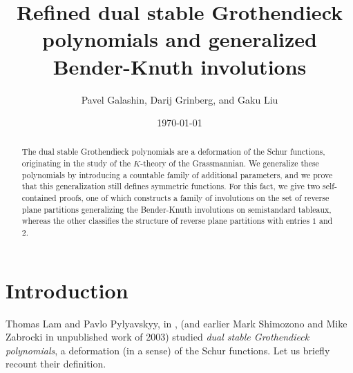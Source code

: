 \documentclass[numbers=enddot,12pt,final,onecolumn,notitlepage]{scrartcl}%
\theoremstyle{definition}
\begin{document}
\title{Refined dual stable Grothendieck polynomials and generalized Bender-Knuth involutions}
\author{Pavel Galashin, Darij Grinberg, and Gaku Liu}
\date{\today}
\maketitle

\begin{abstract}
The dual stable Grothendieck polynomials are a deformation of
the Schur functions, originating in the study of the $K$-theory of the
Grassmannian. We generalize these polynomials by introducing a
countable family of additional parameters, and we prove that this
generalization still defines symmetric functions. For this fact, we
give two self-contained proofs, one of which constructs a family of
involutions on the set of reverse plane partitions generalizing the
Bender-Knuth involutions on semistandard tableaux, whereas the other
classifies the structure of reverse plane partitions with entries $1$
and $2$.
\end{abstract}

\section{Introduction}

Thomas Lam and Pavlo Pylyavskyy, in \cite[\S 9.1]{LamPyl}, (and earlier Mark
Shimozono and Mike Zabrocki in unpublished work of 2003) studied \textit{dual
stable Grothendieck polynomials}, a deformation (in a sense) of the Schur
functions. Let us briefly recount their definition.
\begin{comment}
 
\footnote{All definitions
that will be made in this introduction are provisional. Every notion that will
be used in the paper is going to be defined in more detail and precision in
one of the sections below; thus, a reader not already familiar with Schur
functions and partitions should start reading from Section
\ref{sect.notations} on.}

\end{comment}
\end{document}
